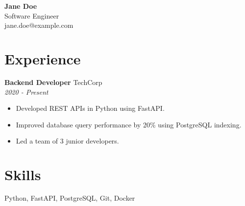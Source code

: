 \documentclass[11pt,a4paper]{article}
\begin{document}
\begin{center}
    {\huge \textbf{Jane Doe}} \\
    \vspace{2mm}
    Software Engineer \\
    jane.doe@example.com
\end{center}

\section*{Experience}
\textbf{Backend Developer} \hfill TechCorp \\
\textit{2020 - Present}
\begin{itemize}
    \item Developed REST APIs in Python using FastAPI.
    \item Improved database query performance by 20\% using PostgreSQL indexing.
    \item Led a team of 3 junior developers.
\end{itemize}

\section*{Skills}
Python, FastAPI, PostgreSQL, Git, Docker
\end{document}
